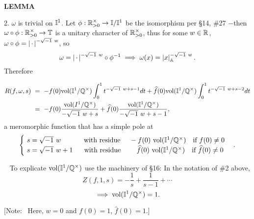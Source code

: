 \begin{x}{\small\bf LEMMA}
\vspace{0.1cm}

2. \quad $\omega$ is trivial on $\mathbb{I}^1$.  Let $\phi: \mathbb{R}_{>0}^\times \rightarrow \mathbb{I}/\mathbb{I}^1$ be the isomorphism per \S14, \#27
$-$then $\omega \circ \phi: \mathbb{R}_{>0}^\times \rightarrow \mathbb{T}$ is a unitary character of $\mathbb{R}_{>0}^\times$, 
thus for some $w \in \mathbb{R}$, $\omega \circ \phi = \left\vert\hspace{0.05cm} \cdot \hspace{0.05cm}\right\vert^{-\sqrt{-1}\ w}$, so
\[
\omega = \left\vert\hspace{0.05cm} \cdot \hspace{0.05cm}\right\vert^{-\sqrt{-1}\ w} \circ \phi^{-1} \implies \omega(x) = \left\vert x\right\vert_{\mathbb{A}}^{-\sqrt{-1}\ w}.
\]
Therefore

\begin{align*}
R(f,\omega,s)  \ 	
&=\  -f(0) \text{vol}(\mathbb{I}^1/\mathbb{Q}^\times) \int_0^1 t^{-\sqrt{-1} \ w + s - 1} dt + \widehat{f}(0) \text{vol}(\mathbb{I}^1/\mathbb{Q}^\times) \int_0^1 t^{-\sqrt{-1}\ w + s - 2} dt \\
&=\  -f(0) \frac{\text{vol}(I^1/\mathbb{Q}^\times)}{-\sqrt{-1}\ w + s} + \widehat{f}(0) \frac{\text{vol}(\mathbb{I}^1/\mathbb{Q}^\times)}{-\sqrt{-1}\ w + s - 1},
\end{align*}
a meromorphic function that has a simple pole at
\\
\[
\begin{cases}
\ s = \sqrt{-1}\ w \quad \quad \quad \text{ with residue } \quad -f(0) \ \vol(\I^1/\Q^\times) \quad \text{if} \ f(0) \ne 0\\
\ s = \sqrt{-1}\ w+1 \quad \ \text{ with residue } \qquad  \widehat{f}(0) \ \vol(\I^1/\Q^\times) \quad \text{if} \ \widehat{f}(0) \ne 0\\
\end{cases}
.\]

\vspace{0.1cm}



\begin{x}{\small\bf {}} \ %
To explicate $\text{vol}(\mathbb{I}^1/\mathbb{Q}^\times)$ use the machinery of \S16:  In the notation of \#2 above, 
\[
Z(f,1,s) = -\frac{1}{s} + \frac{1}{s-1} + \dotsb 
\]
\[
\implies \text{vol}(\mathbb{I}^1/\mathbb{Q}^\times) = 1.
\]

[Note: \ Here, $w = 0$ and $f(0) = 1$, $\widehat{f}(0) = 1.]$
\end{x}


\end{x}
